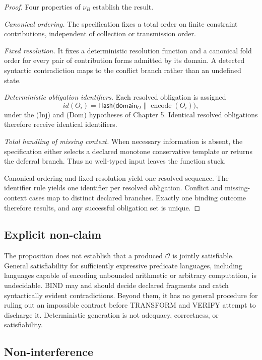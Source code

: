 \documentclass[11pt,openany]{book}
\newcommand{\Hash}{\mathsf{Hash}}
\begin{document}
\begin{proof}
Four properties of \(\nu_B\) establish the result.

\textit{Canonical ordering.} The specification fixes a total order on finite
constraint contributions, independent of collection or transmission order.

\textit{Fixed resolution.} It fixes a deterministic resolution function and
a canonical fold order for every pair of contribution forms admitted by its
domain. A detected syntactic contradiction maps to the conflict branch rather
than an undefined state.

\textit{Deterministic obligation identifiers.} Each resolved obligation is
assigned
\[
 id(O_i)=\Hash\bigl(\mathsf{domain}_O\parallel
                     \operatorname{encode}(O_i)\bigr),
\]
under the (Inj) and (Dom) hypotheses of Chapter 5. Identical resolved
obligations therefore receive identical identifiers.

\textit{Total handling of missing context.} When necessary information is
absent, the specification either selects a declared monotone conservative
template or returns the deferral branch. Thus no well-typed input leaves the
function stuck.

Canonical ordering and fixed resolution yield one resolved sequence. The
identifier rule yields one identifier per resolved obligation. Conflict and
missing-context cases map to distinct declared branches. Exactly one binding
outcome therefore results, and any successful obligation set is unique.
\end{proof}

\subsection{Explicit non-claim}

The proposition does not establish that a produced \(\mathcal O\) is jointly
satisfiable. General satisfiability for sufficiently expressive predicate
languages, including languages capable of encoding unbounded arithmetic or
arbitrary computation, is undecidable. BIND may and should decide declared
fragments and catch syntactically evident contradictions. Beyond them, it has
no general procedure for ruling out an impossible contract before TRANSFORM
and VERIFY attempt to discharge it. Deterministic generation is not adequacy,
correctness, or satisfiability.

\subsection{Non-interference}
\end{document}
